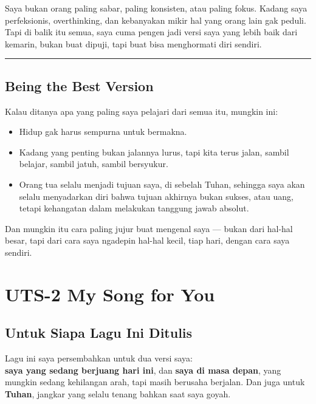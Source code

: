 \documentclass[
  letterpaper,
  DIV=11,
  numbers=noendperiod]{scrreprt}
\begin{document}
Saya bukan orang paling sabar, paling konsisten, atau paling fokus.
Kadang saya perfeksionis, overthinking, dan kebanyakan mikir hal yang
orang lain gak peduli. Tapi di balik itu semua, saya cuma pengen jadi
versi saya yang lebih baik dari kemarin, bukan buat dipuji, tapi buat
bisa menghormati diri sendiri.

\begin{center}\rule{0.5\linewidth}{0.5pt}\end{center}

\section{Being the Best Version}\label{being-the-best-version}

Kalau ditanya apa yang paling saya pelajari dari semua itu, mungkin ini:

\begin{itemize}
\item
  Hidup gak harus sempurna untuk bermakna.
\item
  Kadang yang penting bukan jalannya lurus, tapi kita terus jalan,
  sambil belajar, sambil jatuh, sambil bersyukur.
\item
  Orang tua selalu menjadi tujuan saya, di sebelah Tuhan, sehingga saya
  akan selalu menyadarkan diri bahwa tujuan akhirnya bukan sukses, atau
  uang, tetapi kehangatan dalam melakukan tanggung jawab absolut.
\end{itemize}

Dan mungkin itu cara paling jujur buat mengenal saya --- bukan dari
hal-hal besar, tapi dari cara saya ngadepin hal-hal kecil, tiap hari,
dengan cara saya sendiri.


\chapter{UTS-2 My Song for You}\label{uts-2-my-song-for-you}

\section{Untuk Siapa Lagu Ini
Ditulis}\label{untuk-siapa-lagu-ini-ditulis}

Lagu ini saya persembahkan untuk dua versi saya:\\
\textbf{saya yang sedang berjuang hari ini}, dan \textbf{saya di masa
depan}, yang mungkin sedang kehilangan arah, tapi masih berusaha
berjalan. Dan juga untuk \textbf{Tuhan}, jangkar yang selalu tenang
bahkan saat saya goyah.
\end{document}
